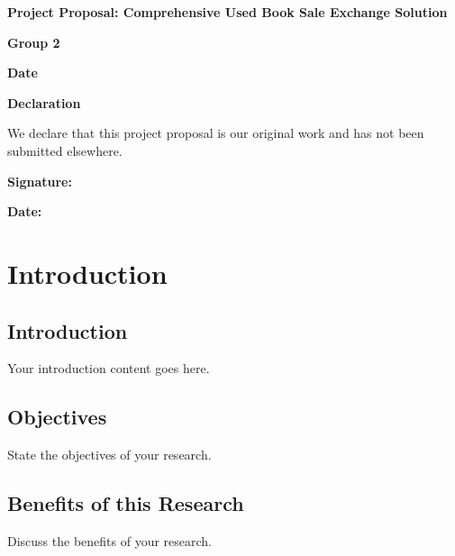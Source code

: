 \documentclass{article}
\begin{document}
\begin{titlepage}
    \centering
    \vspace*{\fill}
    \Huge\textbf{Project Proposal: Comprehensive Used Book Sale Exchange Solution}\par
    \vspace{1cm}
    \Large\textbf{Group 2}\par
    \vspace{1cm}
    \large\textbf{Date}\par
    \vspace*{\fill}
\end{titlepage}

\newpage
\begin{titlepage}
    \centering
    \vspace*{\fill}
    \Huge\textbf{Declaration}\par
    \vspace{1cm}
    \large
    We declare that this project proposal is our original work and has not been submitted elsewhere.\par
    \vspace{1cm}
    \large\textbf{Signature:} \underline{\hspace{6cm}}\par
    \vspace{1cm}
    \large\textbf{Date:} \underline{\hspace{3cm}}\par
    \vspace*{\fill}
\end{titlepage}

\newpage
\tableofcontents

\newpage
\section{Introduction}
\subsection{Introduction}
Your introduction content goes here.

\newpage
\subsection{Objectives}
State the objectives of your research.

\newpage
\subsection{Benefits of this Research}
Discuss the benefits of your research.
\end{document}
